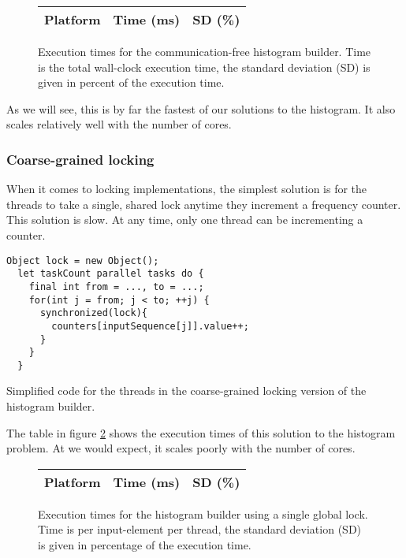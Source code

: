 \begin{figure}[hbtp]
	\centering
	\begin{tabular}{l r r}
		\hline
		\hline
		Platform & Time (ms) & SD (\%) \\
		\hline
		
		\hline
		\hline
	\end{tabular}
	\caption{Execution times for the communication-free histogram builder. Time
is the total wall-clock execution time, the standard deviation (SD) is given in
percent of the execution time.} \label{table:histo-lockfree}
\end{figure}

As we will see, this is by far the fastest of our solutions to the histogram. It
also scales relatively well with the number of cores.

\subsubsection{Coarse-grained locking}
When it comes to locking implementations, the simplest solution is for the
threads to take a single, shared lock anytime they increment a frequency
counter. This solution is slow. At any time, only one thread can be incrementing a counter.

\begin{code}
\begin{Verbatim}[frame=single]
  Object lock = new Object();
  let taskCount parallel tasks do {
    final int from = ..., to = ...;
    for(int j = from; j < to; ++j) {
      synchronized(lock){
        counters[inputSequence[j]].value++;
      }
    }
  }
\end{Verbatim}
	\caption{Simplified code for the threads in the coarse-grained locking
	version of the histogram builder.}
\end{code}

The table in figure \ref{table:histo-global} shows the execution times of this
solution to the histogram problem. At we would expect, it scales poorly with the number of cores.

\begin{figure}[hbtp]
	\centering
	\begin{tabular}{l r r}
		\hline
		\hline
		Platform & Time (ms) & SD (\%) \\
		\hline
		
		\hline
		\hline
	\end{tabular}
	\caption{Execution times for the histogram builder using a single
global lock. Time is per input-element per thread, the standard deviation (SD)
is given in percentage of the execution time.}
	\label{table:histo-global}
\end{figure}

